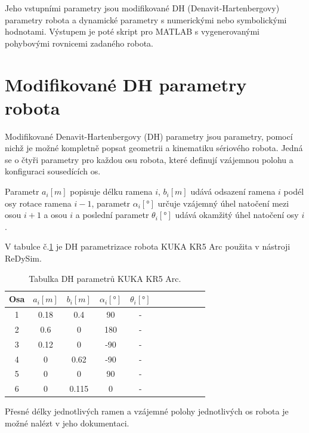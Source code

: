 Jeho vstupními parametry jsou modifikované DH (Denavit-Hartenbergovy) parametry robota a dynamické parametry s numerickými nebo symbolickými hodnotami. Výstupem je poté skript pro MATLAB s vygenerovanými pohybovými rovnicemi zadaného robota.  

\section{Modifikované DH parametry robota}

Modifikované Denavit-Hartenbergovy (DH) parametry jsou parametry, pomocí nichž je možné kompletně popsat geometrii a kinematiku sériového robota. Jedná se o čtyři parametry pro každou osu robota, které definují vzájemnou polohu a konfiguraci sousedících os. 

Parametr $a_i [m]$ popisuje délku ramena $i$, $b_i [m]$ udává odsazení ramena $i$ podél osy rotace ramena $i-1$, parametr $\alpha_i [\si{\degree}]$ určuje vzájemný úhel natočení mezi osou $i+1$ a osou $i$ a poslední parametr $\theta_i [\si{\degree}]$ udává okamžitý úhel natočení osy $i$.

V tabulce č.\ref{tab_DH_kuka} je DH parametrizace robota KUKA KR5 Arc použita v nástroji ReDySim.

\begin{table}[htbp]
  \centering
  \caption{Tabulka DH parametrů KUKA KR5 Arc.}
    \begin{tabular}{c|cccccccccc}
    \multicolumn{1}{c|}{Osa} & \multicolumn{1}{c}{$a_{i} [m]$} & \multicolumn{1}{c}{$b_{i} [m]$} & \multicolumn{1}{c}{$\alpha_{i} [\si{\degree}]$} & \multicolumn{1}{c}{$\theta_i [\si{\degree}]$} \\
    \hline
    1     &   0.18  &  0.4   &  90     &   -    &  \\
    2     &   0.6   &  0     &  180    &   -    &  \\
    3     &   0.12  &  0     &  -90    &   -    &  \\
    4     &   0     &  0.62  &  -90    &   -    &  \\
    5     &   0     &  0     &  90     &   -    &  \\
    6     &   0     &  0.115 &  0      &   -    &  \\
    \end{tabular}%
  \label{tab_DH_kuka}%
\end{table}%

Přesné délky jednotlivých ramen a vzájemné polohy jednotlivých os robota je možné nalézt v jeho dokumentaci.


